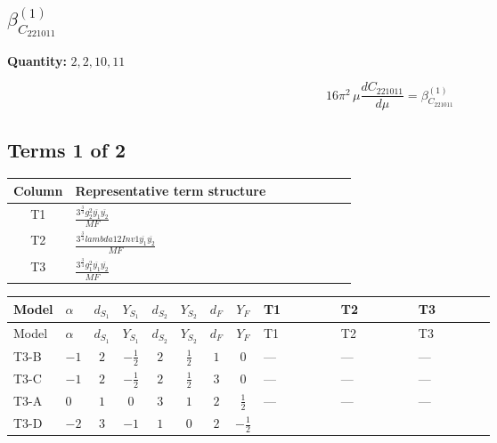\documentclass[8pt]{article}
\begin{document}
\begin{landscape}
\section*{$\beta_{C_{221011}}^{(1)}$}
\noindent\textbf{Quantity: }$\mathrm{2,2,10,11}$\par\smallskip
\[16\pi^2\,\mu\frac{d C_{221011}}{d\mu}=\beta_{C_{221011}}^{(1)}\]
\subsection*{Terms 1 of 2}
\begin{center}
\begin{tabular}{@{}c >{\raggedright\arraybackslash}p{0.82\linewidth}@{}}
\toprule
Column & Representative term structure \\
\midrule
T1 & \(\displaystyle \frac{3^{\frac{3}{4}} g_{2}^{2} \overline{y_{1}} \overline{y_{2}}}{MF}\) \\
\midrule
T2 & \(\displaystyle \frac{3^{\frac{3}{4}} lambda12Inv1 \overline{y_{1}} \overline{y_{2}}}{MF}\) \\
\midrule
T3 & \(\displaystyle \frac{3^{\frac{3}{4}} g_{1}^{2} \overline{y_{1}} \overline{y_{2}}}{MF}\) \\
\midrule
\bottomrule
\end{tabular}
\end{center}
\smallskip
\tiny
\begin{longtable}{@{}llcccccc >{\raggedright\arraybackslash}p{0.21\linewidth} >{\raggedright\arraybackslash}p{0.21\linewidth} >{\raggedright\arraybackslash}p{0.21\linewidth}@{}}
\toprule
Model & $\alpha$ & $d_{S_1}$ & $Y_{S_1}$ & $d_{S_2}$ & $Y_{S_2}$ & $d_F$ & $Y_F$ & T1 & T2 & T3 \\
\midrule
\endfirsthead
\toprule
Model & $\alpha$ & $d_{S_1}$ & $Y_{S_1}$ & $d_{S_2}$ & $Y_{S_2}$ & $d_F$ & $Y_F$ & T1 & T2 & T3 \\
\midrule
\endhead
T3-B & $-1$ & $2$ & $-\frac{1}{2}$ & $2$ & $\frac{1}{2}$ & $1$ & $0$ & --- & --- & --- \\
\midrule
T3-C & $-1$ & $2$ & $-\frac{1}{2}$ & $2$ & $\frac{1}{2}$ & $3$ & $0$ & --- & --- & --- \\
\midrule
T3-A & $0$ & $1$ & $0$ & $3$ & $1$ & $2$ & $\frac{1}{2}$ & --- & --- & --- \\
\midrule
T3-D & $-2$ & $3$ & $-1$ & $1$ & $0$ & $2$ & $-\frac{1}{2}$ & \scriptsize\adjustbox{max width=\linewidth}{$\begin{gathered} - \frac{17 \cdot 3^{\frac{3}{4}} g_{2}^{2} \overline{y_{1}} \overline{y_{2}}}{24 MF}\end{gathered}$} & \scriptsize\adjustbox{max width=\linewidth}{$\begin{gathered} - \frac{3^{\frac{3}{4}} lambda12Inv1 \overline{y_{1}} \overline{y_{2}}}{6 MF}\end{gathered}$} & \scriptsize\adjustbox{max width=\linewidth}{$\begin{gathered} - \frac{3^{\frac{3}{4}} g_{1}^{2} \overline{y_{1}} \overline{y_{2}}}{8 MF}\end{gathered}$} \\

\end{longtable}
\end{landscape}
\end{document}
